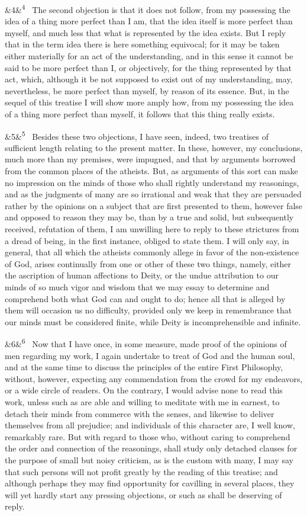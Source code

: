 \documentclass[12pt]{article}
\newcommand{\para}[1][]{\par\noindent\ifx&#1&\else\textsuperscript{\footnotesize #1}~\fi}
\begin{document}
\para[4] The second objection is that it does not follow, from my possessing the idea of a thing more perfect than I am, that the idea itself is more perfect than myself, and much less that what is represented by the idea exists. But I reply that in the term idea there is here something equivocal; for it may be taken either materially for an act of the understanding, and in this sense it cannot be said to be more perfect than I, or objectively, for the thing represented by that act, which, although it be not supposed to exist out of my understanding, may, nevertheless, be more perfect than myself, by reason of its essence. But, in the sequel of this treatise I will show more amply how, from my possessing the idea of a thing more perfect than myself, it follows that this thing really exists.

\para[5] Besides these two objections, I have seen, indeed, two treatises of sufficient length relating to the present matter. In these, however, my conclusions, much more than my premises, were impugned, and that by arguments borrowed from the common places of the atheists. But, as arguments of this sort can make no impression on the minds of those who shall rightly understand my reasonings, and as the judgments of many are so irrational and weak that they are persuaded rather by the opinions on a subject that are first presented to them, however false and opposed to reason they may be, than by a true and solid, but subsequently received, refutation of them, I am unwilling here to reply to these strictures from a dread of being, in the first instance, obliged to state them. I will only say, in general, that all which the atheists commonly allege in favor of the non-existence of God, arises continually from one or other of these two things, namely, either the ascription of human affections to Deity, or the undue attribution to our minds of so much vigor and wisdom that we may essay to determine and comprehend both what God can and ought to do; hence all that is alleged by them will occasion us no difficulty, provided only we keep in remembrance that our minds must be considered finite, while Deity is incomprehensible and infinite.

\para[6] Now that I have once, in some measure, made proof of the opinions of men regarding my work, I again undertake to treat of God and the human soul, and at the same time to discuss the principles of the entire First Philosophy, without, however, expecting any commendation from the crowd for my endeavors, or a wide circle of readers. On the contrary, I would advise none to read this work, unless such as are able and willing to meditate with me in earnest, to detach their minds from commerce with the senses, and likewise to deliver themselves from all prejudice; and individuals of this character are, I well know, remarkably rare. But with regard to those who, without caring to comprehend the order and connection of the reasonings, shall study only detached clauses for the purpose of small but noisy criticism, as is the custom with many, I may say that such persons will not profit greatly by the reading of this treatise; and although perhaps they may find opportunity for cavilling in several places, they will yet hardly start any pressing objections, or such as shall be deserving of reply.
\end{document}
